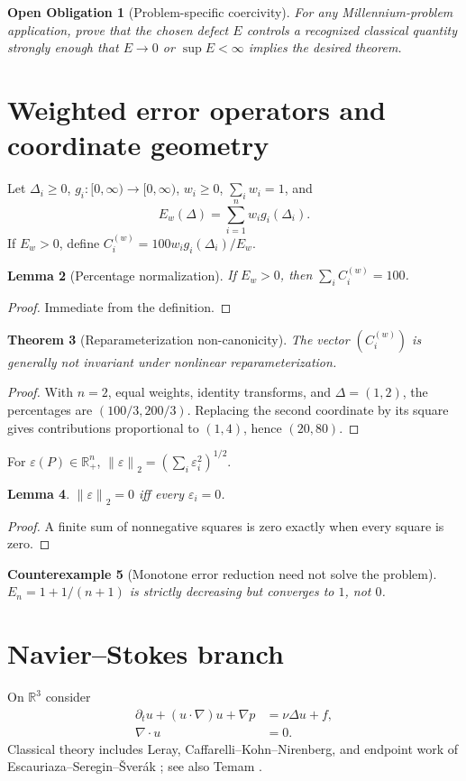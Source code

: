 \documentclass[11pt]{article}
\newtheorem{theorem}{Theorem}[section]
\newtheorem{lemma}[theorem]{Lemma}
\newtheorem{obligation}[theorem]{Open Obligation}
\newtheorem{counterexample}[theorem]{Counterexample}
\newcommand{\R}{\mathbb{R}}
\newcommand{\eps}{\varepsilon}
\newcommand{\norm}[1]{\left\lVert #1\right\rVert}
\begin{document}
\begin{obligation}[Problem-specific coercivity]
For any Millennium-problem application, prove that the chosen defect $E$ controls a recognized classical quantity strongly enough that $E\to0$ or $\sup E<\infty$ implies the desired theorem.
\end{obligation}

\section{Weighted error operators and coordinate geometry}
Let $\Delta_i\ge0$, $g_i:[0,\infty)\to[0,\infty)$, $w_i\ge0$, $\sum_iw_i=1$, and
\[
E_w(\Delta)=\sum_{i=1}^n w_i g_i(\Delta_i).
\]
If $E_w>0$, define $C_i^{(w)}=100w_i g_i(\Delta_i)/E_w$.

\begin{lemma}[Percentage normalization]
If $E_w>0$, then $\sum_iC_i^{(w)}=100$.
\end{lemma}
\begin{proof}Immediate from the definition.\end{proof}

\begin{theorem}[Reparameterization non-canonicity]
The vector $(C_i^{(w)})$ is generally not invariant under nonlinear reparameterization.
\end{theorem}
\begin{proof}With $n=2$, equal weights, identity transforms, and $\Delta=(1,2)$, the percentages are $(100/3,200/3)$. Replacing the second coordinate by its square gives contributions proportional to $(1,4)$, hence $(20,80)$.\end{proof}

For $\eps(P)\in\R_+^n$, $\norm{\eps}_2=(\sum_i\eps_i^2)^{1/2}$.
\begin{lemma}$\norm{\eps}_2=0$ iff every $\eps_i=0$.\end{lemma}
\begin{proof}A finite sum of nonnegative squares is zero exactly when every square is zero.\end{proof}

\begin{counterexample}[Monotone error reduction need not solve the problem]
$E_n=1+1/(n+1)$ is strictly decreasing but converges to $1$, not $0$.
\end{counterexample}

\section{Navier--Stokes branch}
On $\R^3$ consider
\begin{align}
\partial_t u +(u\cdot\nabla)u+\nabla p &= \nu\Delta u+f,\\
\nabla\cdot u &=0.
\end{align}
Classical theory includes Leray, Caffarelli--Kohn--Nirenberg, and endpoint work of Escauriaza--Seregin--\v{S}ver\'ak \cite{Leray1934,CKN1982,ESS2003}; see also Temam \cite{Temam2001}.
\end{document}
